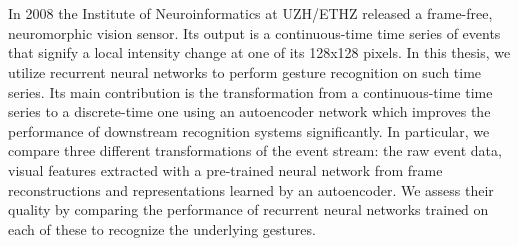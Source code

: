 \chapter{\abstractname}

In 2008 the Institute of Neuroinformatics at UZH/ETHZ released a frame-free,
neuromorphic vision sensor. Its output is a continuous-time time series of
events that signify a local intensity change at one of its 128x128 pixels. In
this thesis, we utilize recurrent neural networks to perform gesture recognition
on such time series. Its main contribution is the transformation from a
continuous-time time series to a discrete-time one using an autoencoder network
which improves the performance of downstream recognition systems significantly.
In particular, we compare three different transformations of the event stream:
the raw event data, visual features extracted with a pre-trained neural network
from frame reconstructions and representations learned by an autoencoder. We
assess their quality by comparing the performance of recurrent neural networks
trained on each of these to recognize the underlying gestures.
